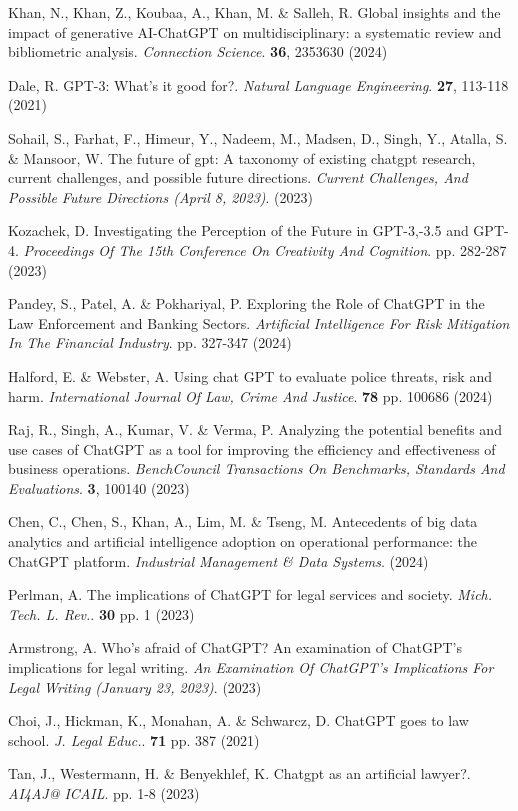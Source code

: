 \documentclass[preprint,12pt,number]{elsarticle}
\begin{document}
\begin{thebibliography}{00}
Khan, N., Khan, Z., Koubaa, A., Khan, M. \& Salleh, R. Global insights and the impact of generative AI-ChatGPT on multidisciplinary: a systematic review and bibliometric analysis. {\em Connection Science}. \textbf{36}, 2353630 (2024)

Dale, R. GPT-3: What’s it good for?. {\em Natural Language Engineering}. \textbf{27}, 113-118 (2021)

Sohail, S., Farhat, F., Himeur, Y., Nadeem, M., Madsen, D., Singh, Y., Atalla, S. \& Mansoor, W. The future of gpt: A taxonomy of existing chatgpt research, current challenges, and possible future directions. {\em Current Challenges, And Possible Future Directions (April 8, 2023)}. (2023)

Kozachek, D. Investigating the Perception of the Future in GPT-3,-3.5 and GPT-4. {\em Proceedings Of The 15th Conference On Creativity And Cognition}. pp. 282-287 (2023)

Pandey, S., Patel, A. \& Pokhariyal, P. Exploring the Role of ChatGPT in the Law Enforcement and Banking Sectors. {\em Artificial Intelligence For Risk Mitigation In The Financial Industry}. pp. 327-347 (2024)

Halford, E. \& Webster, A. Using chat GPT to evaluate police threats, risk and harm. {\em International Journal Of Law, Crime And Justice}. \textbf{78} pp. 100686 (2024)

Raj, R., Singh, A., Kumar, V. \& Verma, P. Analyzing the potential benefits and use cases of ChatGPT as a tool for improving the efficiency and effectiveness of business operations. {\em BenchCouncil Transactions On Benchmarks, Standards And Evaluations}. \textbf{3}, 100140 (2023)

Chen, C., Chen, S., Khan, A., Lim, M. \& Tseng, M. Antecedents of big data analytics and artificial intelligence adoption on operational performance: the ChatGPT platform. {\em Industrial Management \& Data Systems}. (2024)

Perlman, A. The implications of ChatGPT for legal services and society. {\em Mich. Tech. L. Rev.}. \textbf{30} pp. 1 (2023)

Armstrong, A. Who’s afraid of ChatGPT? An examination of ChatGPT’s implications for legal writing. {\em An Examination Of ChatGPT’s Implications For Legal Writing (January 23, 2023)}. (2023)

Choi, J., Hickman, K., Monahan, A. \& Schwarcz, D. ChatGPT goes to law school. {\em J. Legal Educ.}. \textbf{71} pp. 387 (2021)

Tan, J., Westermann, H. \& Benyekhlef, K. Chatgpt as an artificial lawyer?. {\em AI4AJ@ ICAIL}. pp. 1-8 (2023)

\end{thebibliography}
\end{document}
